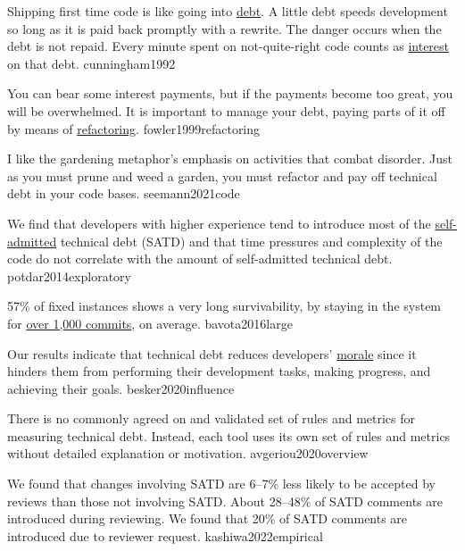 \documentclass{article}
\begin{document}

  {Shipping first time code is like going into \ul{debt}. A little debt speeds development so long as it is paid back promptly with a rewrite. The danger occurs when the debt is not repaid. Every minute spent on not-quite-right code counts as \ul{interest} on that debt.}
  {cunningham1992}


  {You can bear some interest payments, but if the payments become too great, you will be overwhelmed. It is important to manage your debt, paying parts of it off by means of \ul{refactoring}.}
  {fowler1999refactoring}

  {I like the gardening metaphor's emphasis on activities that combat disorder. Just as you must prune and weed a garden, you must refactor and pay off technical debt in your code bases.}
  {seemann2021code}


  {We find that developers with higher experience tend to introduce most of the \ul{self-admitted} technical debt (SATD) and that time pressures and complexity of the code do not correlate with the amount of self-admitted technical debt.}
  {potdar2014exploratory}

  {57\% of fixed instances shows a very long survivability, by staying in the system for \ul{over 1,000 commits}, on average.}
  {bavota2016large}

  {Our results indicate that technical debt reduces developers' \ul{morale} since it hinders them from performing their development tasks, making progress, and achieving their goals.}
  {besker2020influence}

  {There is no commonly agreed on and validated set of rules and metrics for measuring technical debt. Instead, each tool uses its own set of rules and metrics without detailed explanation or motivation.}
  {avgeriou2020overview}

  {We found that changes involving SATD are 6–7\% less likely to be accepted by reviews than those not involving SATD. About 28–48\% of SATD comments are introduced during reviewing. We found that 20\% of SATD comments are introduced due to reviewer request.}
  {kashiwa2022empirical}
\end{document}
